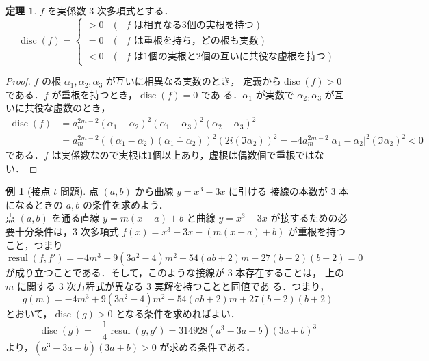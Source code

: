 \documentclass[12pt, uplatex, dvipdfmx]{jsarticle}
\theoremstyle{definition}
\newtheorem{theorem}{定理}
\newtheorem{example}{例}
\DeclareMathOperator{\resul}{resul}
\DeclareMathOperator{\disc}{disc}
\begin{document}
\begin{theorem}
  $f$ を実係数 $3$ 次多項式とする．
  \[
    \disc (f) =
    \begin{cases}
      >0 & (\text{ $f$ は相異なる3個の実根を持つ})\\
      =0 & (\text{ $f$ は重根を持ち，どの根も実数})\\
      <0 & (\text{ $f$ は1個の実根と2個の互いに共役な虚根を持つ})
    \end{cases}
  \]
\end{theorem}

\begin{proof}
  $f$ の根 $\alpha_1, \alpha_2, \alpha_3$ が互いに相異なる実数のとき，
  定義から$\disc(f) >0$ である．$f$ が重根を持つとき，$\disc(f)=0$ であ
  る．$\alpha_1$ が実数で $\alpha_2, \alpha_3$ が互いに共役な虚数のとき，
  \[
    \begin{aligned}
      \disc(f) &= a_m^{2m-2} (\alpha_1-\alpha_2)^2(\alpha_1-\alpha_3)^2(\alpha_2-\alpha_3)^2\\
      &=a_m^{2m-2}\left( \left( \alpha_1 - \alpha_2\right)\left(\overline{\alpha_1-\alpha_2}\right)\right)^2
      \left( 2 i \left(\Im \alpha_2\right)\right)^2
      = -4 a_m^{2m-2} \left| \alpha_1-\alpha_2\right|^2 \left( \Im \alpha_2\right)^2 <0
    \end{aligned}
  \]
  である．$f$ は実係数なので実根は1個以上あり，虚根は偶数個で重根ではない．
\end{proof}


\begin{example}[接点 $t$ 問題] 点 $(a,b)$ から曲線 $y=x^3-3x$ に引ける
  接線の本数が $3$ 本になるときの $a,b$ の条件を求めよう．\\

  点 $(a,b)$ を通る直線 $y=m(x-a)+b$ と曲線 $y=x^3-3x$ が接するための必
  要十分条件は，$3$ 次多項式 $f(x) = x^3-3x - \left( m(x-a)+b\right)$
  が重根を持つこと，つまり
  \[
    \resul(f, f') = -4 m^{3}+9 \left(3 a^{2}-4\right) m^{2}-54 \left(a
      b +2\right) m +27 \left(b -2\right) \left(b +2\right)=0
  \]
  が成り立つことである．そして，このような接線が $3$ 本存在することは，
  上の $m$ に関する $3$ 次方程式が異なる $3$ 実解を持つことと同値であ
  る．つまり，
  \[
    g(m) = -4 m^{3}+9 \left(3 a^{2}-4\right) m^{2}-54 \left(a
      b +2\right) m +27 \left(b -2\right) \left(b +2\right)
  \]
  とおいて，$\disc(g)>0$ となる条件を求めればよい．
  \[
    \disc(g) = \frac{-1}{-4}\resul(g,g') = 314928 (a^3-3a-b)(3a+b)^3
  \]
  より，$(a^3-3a-b)(3a+b)>0$ が求める条件である．
\end{example}
\end{document}

